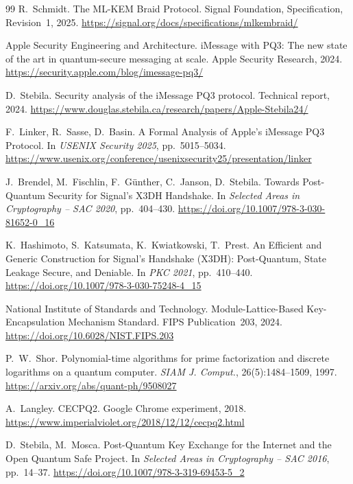 \documentclass[11pt,a4paper]{article}
\theoremstyle{definition}
\begin{document}
\begin{thebibliography}{99}
R.~Schmidt.
\newblock The ML-KEM Braid Protocol.
\newblock Signal Foundation, Specification, Revision~1, 2025.
\newblock \url{https://signal.org/docs/specifications/mlkembraid/}

Apple Security Engineering and Architecture.
\newblock iMessage with PQ3: The new state of the art in quantum-secure
  messaging at scale.
\newblock Apple Security Research, 2024.
\newblock \url{https://security.apple.com/blog/imessage-pq3/}

D.~Stebila.
\newblock Security analysis of the iMessage PQ3 protocol.
\newblock Technical report, 2024.
\newblock \url{https://www.douglas.stebila.ca/research/papers/Apple-Stebila24/}

F.~Linker, R.~Sasse, D.~Basin.
\newblock A Formal Analysis of Apple's iMessage PQ3 Protocol.
\newblock In \emph{USENIX Security 2025}, pp.~5015--5034.
\newblock \url{https://www.usenix.org/conference/usenixsecurity25/presentation/linker}

J.~Brendel, M.~Fischlin, F.~G{\"u}nther, C.~Janson, D.~Stebila.
\newblock Towards Post-Quantum Security for Signal's X3DH Handshake.
\newblock In \emph{Selected Areas in Cryptography -- SAC 2020}, pp.~404--430.
\newblock \url{https://doi.org/10.1007/978-3-030-81652-0_16}

K.~Hashimoto, S.~Katsumata, K.~Kwiatkowski, T.~Prest.
\newblock An Efficient and Generic Construction for Signal's Handshake
  (X3DH): Post-Quantum, State Leakage Secure, and Deniable.
\newblock In \emph{PKC 2021}, pp.~410--440.
\newblock \url{https://doi.org/10.1007/978-3-030-75248-4_15}

National Institute of Standards and Technology.
\newblock Module-Lattice-Based Key-Encapsulation Mechanism Standard.
\newblock FIPS Publication~203, 2024.
\newblock \url{https://doi.org/10.6028/NIST.FIPS.203}

P.~W.~Shor.
\newblock Polynomial-time algorithms for prime factorization and
  discrete logarithms on a quantum computer.
\newblock \emph{SIAM J. Comput.}, 26(5):1484--1509, 1997.
\newblock \url{https://arxiv.org/abs/quant-ph/9508027}

A.~Langley.
\newblock CECPQ2.
\newblock Google Chrome experiment, 2018.
\newblock \url{https://www.imperialviolet.org/2018/12/12/cecpq2.html}

D.~Stebila, M.~Mosca.
\newblock Post-Quantum Key Exchange for the Internet and the Open
  Quantum Safe Project.
\newblock In \emph{Selected Areas in Cryptography -- SAC 2016}, pp.~14--37.
\newblock \url{https://doi.org/10.1007/978-3-319-69453-5_2}


\end{thebibliography}
\end{document}
